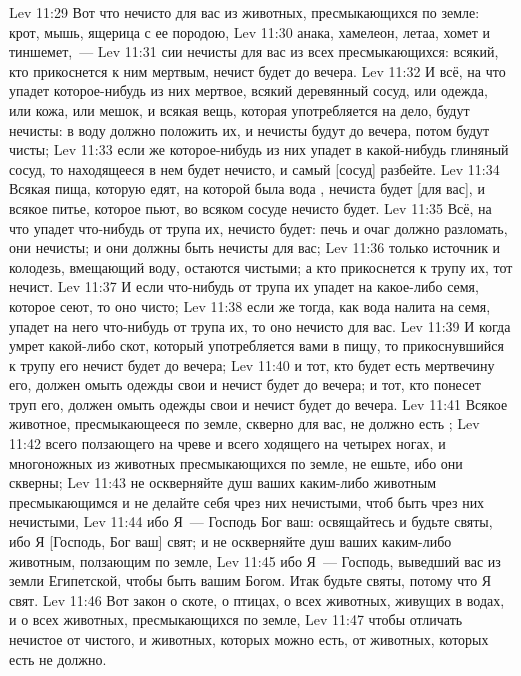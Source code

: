 \rsbpar\vs Lev 11:29 Вот что нечисто для вас из животных, пресмыкающихся по земле: крот, мышь, ящерица с ее породою,
\vs Lev 11:30 анака, хамелеон, летаа, хомет и тиншемет,~---
\vs Lev 11:31 сии нечисты для вас из всех пресмыкающихся: всякий, кто прикоснется к ним мертвым, нечист будет до вечера.
\vs Lev 11:32 И всё, на что упадет которое-нибудь из них мертвое, всякий деревянный сосуд, или одежда, или кожа, или мешок, и всякая вещь, которая употребляется на дело, будут нечисты: в воду должно положить их, и нечисты будут до вечера, потом будут чисты;
\vs Lev 11:33 если же которое-нибудь из них упадет в какой-нибудь глиняный сосуд, то находящееся в нем будет нечисто, и самый [сосуд] разбейте.
\vs Lev 11:34 Всякая пища, которую едят, на которой была вода , нечиста будет [для вас], и всякое питье, которое пьют, во всяком  сосуде нечисто будет.
\vs Lev 11:35 Всё, на что упадет что-нибудь от трупа их, нечисто будет: печь и очаг должно разломать, они нечисты; и они должны быть нечисты для вас;
\vs Lev 11:36 только источник и колодезь, вмещающий воду, остаются чистыми; а кто прикоснется к трупу их, тот нечист.
\vs Lev 11:37 И если что-нибудь от трупа их упадет на какое-либо семя, которое сеют, то оно чисто;
\vs Lev 11:38 если же тогда, как вода налита на семя, упадет на него что-нибудь от трупа их, то оно нечисто для вас.
\vs Lev 11:39 И когда умрет какой-либо скот, который употребляется вами в пищу, то прикоснувшийся к трупу его нечист будет до вечера;
\vs Lev 11:40 и тот, кто будет есть мертвечину его, должен омыть одежды свои и нечист будет до вечера; и тот, кто понесет труп его, должен омыть одежды свои и нечист будет до вечера.
\vs Lev 11:41 Всякое животное, пресмыкающееся по земле, скверно для вас, не должно есть ;
\vs Lev 11:42 всего ползающего на чреве и всего ходящего на четырех ногах, и многоножных из животных пресмыкающихся по земле, не ешьте, ибо они скверны;
\vs Lev 11:43 не оскверняйте душ ваших каким-либо животным пресмыкающимся и не делайте себя чрез них нечистыми, чтоб быть чрез них нечистыми,
\vs Lev 11:44 ибо Я~--- Господь Бог ваш: освящайтесь и будьте святы, ибо Я [Господь, Бог ваш] свят; и не оскверняйте душ ваших каким-либо животным, ползающим по земле,
\vs Lev 11:45 ибо Я~--- Господь, выведший вас из земли Египетской, чтобы быть вашим Богом. Итак будьте святы, потому что Я свят.
\rsbpar\vs Lev 11:46 Вот закон о скоте, о птицах, о всех животных, живущих в водах, и о всех животных, пресмыкающихся по земле,
\vs Lev 11:47 чтобы отличать нечистое от чистого, и животных, которых можно есть, от животных, которых есть не должно.
